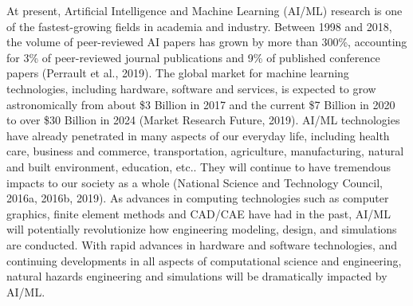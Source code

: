 At present, Artificial Intelligence and Machine Learning (AI/ML) research is one of the fastest-growing fields in academia and industry. Between 1998 and 2018, the volume of peer-reviewed AI papers has grown by more than 300\%, accounting for 3\% of peer-reviewed journal publications and 9\% of published conference papers (Perrault et al., 2019). The global market for machine learning technologies, including hardware, software and services, is expected to grow astronomically from about \$3 Billion in 2017 and the current \$7 Billion in 2020 to over \$30 Billion in 2024 (Market Research Future, 2019). AI/ML technologies have already penetrated in many aspects of our everyday life, including health care, business and commerce, transportation, agriculture, manufacturing, natural and built environment, education, etc.. They will continue to have tremendous impacts to our society as a whole (National Science and Technology Council, 2016a, 2016b, 2019). As advances in computing technologies such as computer graphics, finite element methods and CAD/CAE have had in the past, AI/ML will potentially revolutionize how engineering modeling, design, and simulations are conducted. With rapid advances in hardware and software technologies, and continuing developments in all aspects of computational science and engineering, natural hazards engineering and simulations will be dramatically impacted by AI/ML.

